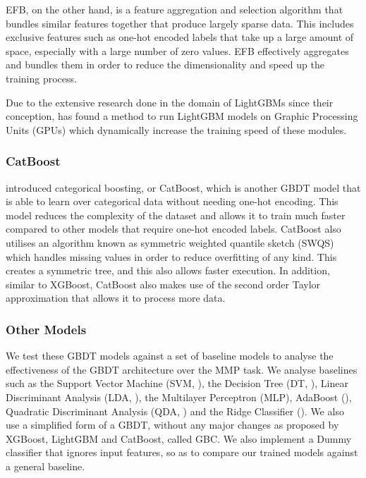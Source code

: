 \documentclass[pdflatex,sn-basic,10pt]{sn-jnl}%
\begin{document}
EFB, on the other hand, is a feature aggregation and selection algorithm that bundles similar features together that produce largely sparse data. This includes exclusive features such as one-hot encoded labels that take up a large amount of space, especially with a large number of zero values. EFB effectively aggregates and bundles them in order to reduce the dimensionality and speed up the training process.

Due to the extensive research done in the domain of LightGBMs since their conception, \cite{zhang2017gpu} has found a method to run LightGBM models on Graphic Processing Units (GPUs) which dynamically increase the training speed of these modules.

\subsubsection{CatBoost}

\cite{catboost} introduced categorical boosting, or CatBoost, which is another GBDT model that is able to learn over categorical data without needing one-hot encoding. This model reduces the complexity of the dataset and allows it to train much faster compared to other models that require one-hot encoded labels. CatBoost also utilises an algorithm known as symmetric weighted quantile sketch (SWQS) which handles missing values in order to reduce overfitting of any kind. This creates a symmetric tree, and this also allows faster execution. In addition, similar to XGBoost, CatBoost also makes use of the second order Taylor approximation that allows it to process more data.



\subsubsection{Other Models}

We test these GBDT models against a set of baseline models to analyse the effectiveness of the GBDT architecture over the MMP task. We analyse baselines such as the Support Vector Machine (SVM, \cite{cortes1995support}), the Decision Tree (DT, \cite{breiman1984,quinlan1986induction}), Linear Discriminant Analysis (LDA, \cite{fisher1936use}), the Multilayer Perceptron (MLP), AdaBoost (\cite{freund1995desicion}), Quadratic Discriminant Analysis (QDA, \cite{fisher1936use}) and the Ridge Classifier (\cite{horel1962application}). We also use a simplified form of a GBDT, without any major changes as proposed by XGBoost, LightGBM and CatBoost, called GBC. We also implement a Dummy classifier that ignores input features, so as to compare our trained models against a general baseline.
\end{document}
